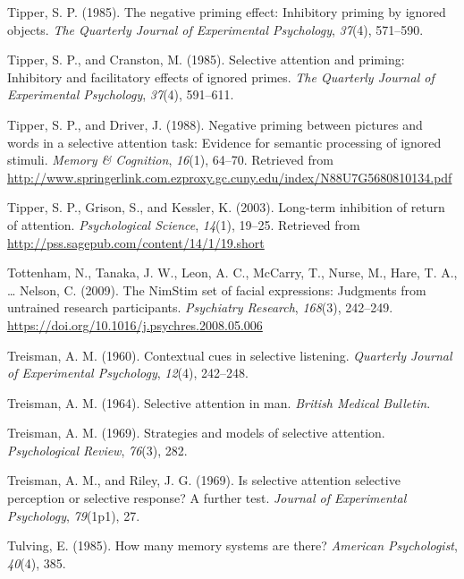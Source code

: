 \documentclass[]{DissertateCUNY}
\begin{document}
\leavevmode\hypertarget{ref-tipper_negative_1985}{}%
Tipper, S. P. (1985). The negative priming effect: Inhibitory priming by
ignored objects. \emph{The Quarterly Journal of Experimental
Psychology}, \emph{37}(4), 571--590.

\leavevmode\hypertarget{ref-tipper_selective_1985}{}%
Tipper, S. P., and Cranston, M. (1985). Selective attention and priming:
Inhibitory and facilitatory effects of ignored primes. \emph{The
Quarterly Journal of Experimental Psychology}, \emph{37}(4), 591--611.

\leavevmode\hypertarget{ref-tipper_negative_1988}{}%
Tipper, S. P., and Driver, J. (1988). Negative priming between pictures
and words in a selective attention task: Evidence for semantic
processing of ignored stimuli. \emph{Memory \& Cognition}, \emph{16}(1),
64--70. Retrieved from
\url{http://www.springerlink.com.ezproxy.gc.cuny.edu/index/N88U7G5680810134.pdf}

\leavevmode\hypertarget{ref-tipper_long-term_2003}{}%
Tipper, S. P., Grison, S., and Kessler, K. (2003). Long-term inhibition
of return of attention. \emph{Psychological Science}, \emph{14}(1),
19--25. Retrieved from
\url{http://pss.sagepub.com/content/14/1/19.short}

\leavevmode\hypertarget{ref-tottenham_nimstim_2009}{}%
Tottenham, N., Tanaka, J. W., Leon, A. C., McCarry, T., Nurse, M., Hare,
T. A., \ldots{} Nelson, C. (2009). The NimStim set of facial
expressions: Judgments from untrained research participants.
\emph{Psychiatry Research}, \emph{168}(3), 242--249.
\url{https://doi.org/10.1016/j.psychres.2008.05.006}

\leavevmode\hypertarget{ref-treisman_contextual_1960}{}%
Treisman, A. M. (1960). Contextual cues in selective listening.
\emph{Quarterly Journal of Experimental Psychology}, \emph{12}(4),
242--248.

\leavevmode\hypertarget{ref-treisman_selective_1964}{}%
Treisman, A. M. (1964). Selective attention in man. \emph{British
Medical Bulletin}.

\leavevmode\hypertarget{ref-treisman_strategies_1969}{}%
Treisman, A. M. (1969). Strategies and models of selective attention.
\emph{Psychological Review}, \emph{76}(3), 282.

\leavevmode\hypertarget{ref-treisman_is_1969}{}%
Treisman, A. M., and Riley, J. G. (1969). Is selective attention
selective perception or selective response? A further test.
\emph{Journal of Experimental Psychology}, \emph{79}(1p1), 27.

\leavevmode\hypertarget{ref-tulving_how_1985}{}%
Tulving, E. (1985). How many memory systems are there? \emph{American
Psychologist}, \emph{40}(4), 385.
\end{document}
